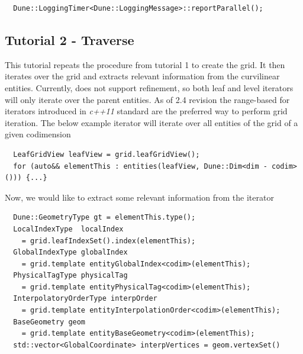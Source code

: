 \begin{mybox}
\begin{lstlisting}
  Dune::LoggingTimer<Dune::LoggingMessage>::reportParallel();
\end{lstlisting}
\end{mybox}



\subsection{Tutorial 2 - Traverse}
\label{usage-howto-tutorial-traverse}

This tutorial repeats the procedure from tutorial 1 to create the grid. It then iterates over the grid and extracts relevant information from the curvilinear entities. Currently, \curvgrid{} does not support refinement, so both leaf and level iterators will only iterate over the parent entities. As of \dune{} 2.4 revision the range-based for iterators introduced in \textit{c++11} standard are the preferred way to perform grid iteration. The below example iterator will iterate over all entities of the grid of a given codimension

\begin{mybox}
\begin{lstlisting}
  LeafGridView leafView = grid.leafGridView();
  for (auto&& elementThis : entities(leafView, Dune::Dim<dim - codim>())) {...}
\end{lstlisting}
\end{mybox}


Now, we would like to extract some relevant information from the iterator
\begin{mybox}
\begin{lstlisting}
  Dune::GeometryType gt = elementThis.type();
  LocalIndexType  localIndex
    = grid.leafIndexSet().index(elementThis);
  GlobalIndexType globalIndex
    = grid.template entityGlobalIndex<codim>(elementThis);
  PhysicalTagType physicalTag
    = grid.template entityPhysicalTag<codim>(elementThis);
  InterpolatoryOrderType interpOrder
    = grid.template entityInterpolationOrder<codim>(elementThis);
  BaseGeometry geom
    = grid.template entityBaseGeometry<codim>(elementThis);
  std::vector<GlobalCoordinate> interpVertices = geom.vertexSet()
\end{lstlisting}
\end{mybox}


